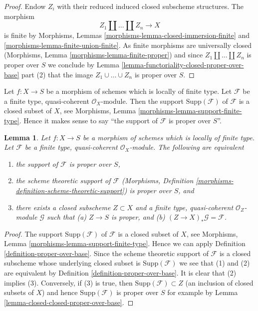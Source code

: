\documentclass{stacks-project}
\theoremstyle{plain}
\newtheorem{lemma}[subsection]{Lemma}
\theoremstyle{definition}
\theoremstyle{remark}
\numberwithin{equation}{subsection}
\begin{document}
\begin{proof}
Endow $Z_i$ with their reduced induced closed subscheme structures.
The morphism
$$
Z_1 \amalg \ldots \amalg Z_n \longrightarrow X
$$
is finite by Morphisms, Lemmas
\ref{morphisms-lemma-closed-immersion-finite} and
\ref{morphisms-lemma-finite-union-finite}.
As finite morphisms are universally closed
(Morphisms, Lemma \ref{morphisms-lemma-finite-proper})
and since $Z_1 \amalg \ldots \amalg Z_n$ is proper over $S$
we conclude by
Lemma \ref{lemma-functoriality-closed-proper-over-base} part (2)
that the image $Z_1 \cup \ldots \cup Z_n$ is proper over $S$.
\end{proof}

\noindent
Let $f : X \to S$ be a morphism of schemes which is locally
of finite type. Let $\mathcal{F}$ be a finite type, quasi-coherent
$\mathcal{O}_X$-module. Then the support $\text{Supp}(\mathcal{F})$
of $\mathcal{F}$ is a closed subset of $X$, see
Morphisms, Lemma \ref{morphisms-lemma-support-finite-type}.
Hence it makes sense to say
``the support of $\mathcal{F}$ is proper over $S$''.

\begin{lemma}
\label{lemma-module-support-proper-over-base}
Let $f : X \to S$ be a morphism of schemes which is locally
of finite type. Let $\mathcal{F}$ be a finite type, quasi-coherent
$\mathcal{O}_X$-module. The following are equivalent
\begin{enumerate}
\item the support of $\mathcal{F}$ is proper over $S$,
\item the scheme theoretic support of $\mathcal{F}$
(Morphisms, Definition \ref{morphisms-definition-scheme-theoretic-support})
is proper over $S$, and
\item there exists a closed subscheme $Z \subset X$ and
a finite type, quasi-coherent $\mathcal{O}_Z$-module
$\mathcal{G}$ such that (a) $Z \to S$ is proper, and (b)
$(Z \to X)_*\mathcal{G} = \mathcal{F}$.
\end{enumerate}
\end{lemma}

\begin{proof}
The support $\text{Supp}(\mathcal{F})$ of $\mathcal{F}$ is a closed subset
of $X$, see Morphisms, Lemma \ref{morphisms-lemma-support-finite-type}.
Hence we can apply Definition \ref{definition-proper-over-base}.
Since the scheme theoretic support of $\mathcal{F}$ is a closed
subscheme whose underlying closed subset is $\text{Supp}(\mathcal{F})$
we see that (1) and (2) are equivalent by
Definition \ref{definition-proper-over-base}.
It is clear that (2) implies (3).
Conversely, if (3) is true, then
$\text{Supp}(\mathcal{F}) \subset Z$
(an inclusion of closed subsets of $X$)
and hence $\text{Supp}(\mathcal{F})$
is proper over $S$ for example by
Lemma \ref{lemma-closed-closed-proper-over-base}.
\end{proof}
\end{document}
